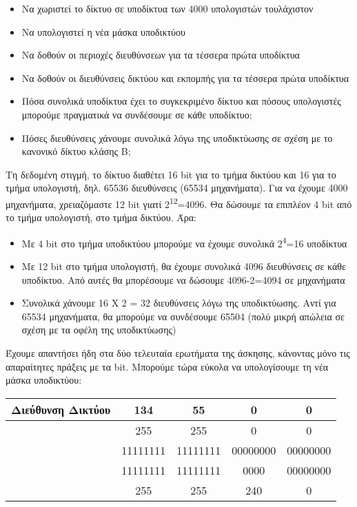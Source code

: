 \begin{itemize}
\item Να χωριστεί το δίκτυο σε υποδίκτυα των 4000 υπολογιστών τουλάχιστον
\item Να υπολογιστεί η νέα μάσκα υποδικτύου
\item Να δοθούν οι περιοχές διευθύνσεων για τα τέσσερα πρώτα υποδίκτυα
\item Να δοθούν οι διευθύνσεις δικτύου και εκπομπής για τα τέσσερα πρώτα υποδίκτυα
\item Πόσα συνολικά υποδίκτυα έχει το συγκεκριμένο δίκτυο και πόσους υπολογιστές μπορούμε πραγματικά να συνδέσουμε σε κάθε υποδίκτυο;
\item Πόσες διευθύνσεις χάνουμε συνολικά λόγω της υποδικτύωσης σε σχέση με το κανονικό δίκτυο κλάσης B;  
\end{itemize}

Τη δεδομένη στιγμή, το δίκτυο διαθέτει 16 bit για το τμήμα δικτύου και 16 για το τμήμα υπολογιστή, δηλ. 65536 διευθύνσεις (65534 μηχανήματα). Για να έχουμε 4000 μηχανήματα, χρειαζόμαστε 12 bit γιατί 2\textsuperscript{12}=4096. Θα δώσουμε τα επιπλέον 4 bit από το τμήμα υπολογιστή, στο τμήμα δικτύου. Άρα:

\begin{itemize}
\item Με 4 bit στο τμήμα υποδικτύου μπορούμε να έχουμε συνολικά 2\textsuperscript{4}=16 υποδίκτυα
\item Με 12 bit στο τμήμα υπολογιστή, θα έχουμε συνολικά 4096 διευθύνσεις σε κάθε υποδίκτυο. Από αυτές θα μπορέσουμε να δώσουμε 4096-2=4094 σε μηχανήματα
\item Συνολικά χάνουμε 16 Χ 2 = 32 διευθύνσεις λόγω της υποδικτύωσης. Αντί για 65534 μηχανήματα, θα μπορούμε να συνδέσουμε 65504 (πολύ μικρή απώλεια σε σχέση με τα οφέλη της υποδικτύωσης)
\end{itemize}

Έχουμε απαντήσει ήδη στα δύο τελευταία ερωτήματα της άσκησης, κάνοντας μόνο τις απαραίτητες πράξεις με τα bit. Μπορούμε τώρα εύκολα να υπολογίσουμε τη νέα μάσκα υποδικτύου:

\begin{center}
\fontsize{11}{13}
\ttfamily
\begin{tabular}{|c|c|c|c|c|}
\hline
 \textbf{Διεύθυνση Δικτύου} & 134 & 55 & 0 & 0 \\ 
\hline
\multirow{2}{*}{} \textbf{Παλιά Μάσκα} & 255 & 255 & 0  & 0 \\ 
\cline{2-5} 
              \textbf{Δικτύου} & 11111111  & 11111111 & 00000000 & 00000000 \\ 
\hline
\multirow{2}{*}{} \textbf{Νέα Μάσκα} & 11111111 & 11111111 & \colorbox{red}{\color{white}{1111}}0000 & 00000000  \\ 
\cline{2-5} 
             \textbf{Υποδικτύου} & 255 & 255 & 240 & 0 \\ 
\hline
\end{tabular}
\normalfont
\end{center}

